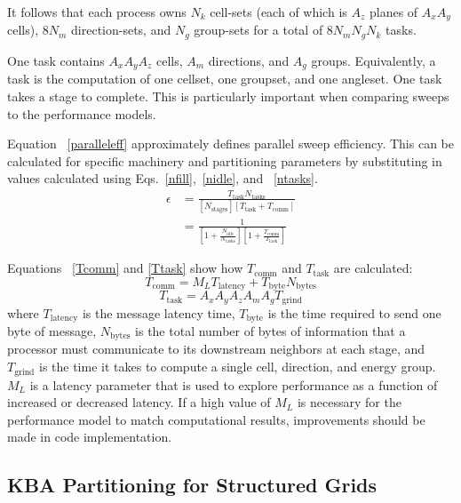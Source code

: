\documentclass{anstrans}
\begin{document}
It follows that each process owns $N_k$ cell-sets (each of which is $A_z$ planes of $A_x A_y$ cells), $8N_m$ direction-sets, and $N_g$ group-sets for a total of $8N_m N_g N_k$ tasks.

One task contains $A_x A_y A_z$ cells, $A_m$ directions, and $A_g$ groups. Equivalently, a task is the computation of one cellset, one groupset, and one angleset. One task takes a stage to complete.  This is particularly important when comparing sweeps to the performance models. 

Equation ~\eqref{paralleleff} approximately defines parallel sweep efficiency. This can be calculated for specific machinery and partitioning parameters by substituting in values calculated using Eqs.~\eqref{nfill},~\eqref{nidle}, and ~\eqref{ntasks}.
\begin{equation}\label{paralleleff}
\begin{split}
\epsilon &= \frac{T_{\text{task}} N_{\text{tasks}}}{[N_{\text{stages}}] [T_{\text{task}} + T_{\text{comm}}]} \\
            &=\frac{1}{[1+\frac{N_{\text{idle}}}{N_{\text{tasks}}}][1 + \frac{T_{\text{comm}}}{T_{\text{task}}}]}
\end{split}
\end{equation}

Equations ~\eqref{Tcomm} and \ref{Ttask} show how $T_{\text{comm}}$ and $T_{\text{task}}$ are calculated:
\begin{equation}
T_{\text{comm}} = M_L T_{\text{latency}} + T_{\text{byte}} N_{\text{bytes}}
\label{Tcomm}
\end{equation}
\begin{equation}
T_{\text{task}} = A_x A_y A_z A_m A_g T_{\text{grind}}
\label{Ttask}
\end{equation}
where $T_{\text{latency}}$ is the message latency time, $T_{\text{byte}}$ is the time required to send one byte of message, $N_{\text{bytes}}$ is the total number of bytes of information that a processor must communicate to its downstream neighbors at each stage, and $T_{\text{grind}}$ is the time it takes to compute a single cell, direction, and energy group. $M_L$ is a latency parameter that is used to explore performance as a function of increased or decreased latency. If a high value of $M_L$ is necessary for the performance model to match computational results, improvements should be made in code implementation.

\subsection{KBA Partitioning for Structured Grids}
\end{document}
